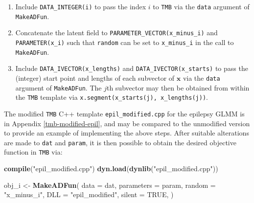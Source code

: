 \documentclass[a4paper, nobind]{templates/ociamthesis}
\providecommand{\tightlist}{%
  \setlength{\itemsep}{0pt}\setlength{\parskip}{0pt}}
\newenvironment{Shaded}{\begin{snugshade}}{\end{snugshade}}
\newcommand{\AttributeTok}[1]{\textcolor[rgb]{0.13,0.29,0.53}{#1}}
\newcommand{\ConstantTok}[1]{\textcolor[rgb]{0.56,0.35,0.01}{#1}}
\newcommand{\FunctionTok}[1]{\textcolor[rgb]{0.13,0.29,0.53}{\textbf{#1}}}
\newcommand{\NormalTok}[1]{#1}
\newcommand{\OtherTok}[1]{\textcolor[rgb]{0.56,0.35,0.01}{#1}}
\newcommand{\StringTok}[1]{\textcolor[rgb]{0.31,0.60,0.02}{#1}}
\renewenvironment{Shaded}
{
  \vspace{10pt}%
  \begin{snugshade}%
}{%
  \end{snugshade}%
  \vspace{8pt}%
}
\begin{document}
\begin{enumerate}
\def\labelenumi{\arabic{enumi}.}
\tightlist
\item
  Include \texttt{DATA\_INTEGER(i)} to pass the index \(i\) to \texttt{TMB} via the \texttt{data} argument of \texttt{MakeADFun}.
\item
  Concatenate the latent field to \texttt{PARAMETER\_VECTOR(x\_minus\_i)} and \texttt{PARAMETER(x\_i)} such that \texttt{random} can be set to \texttt{x\_minus\_i} in the call to \texttt{MakeADFun}.
\item
  Include \texttt{DATA\_IVECTOR(x\_lengths)} and \texttt{DATA\_IVECTOR(x\_starts)} to pass the (integer) start point and lengths of each subvector of \(\mathbf{x}\) via the \texttt{data} argument of \texttt{MakeADFun}.
  The \(j\)th subvector may then be obtained from within the \texttt{TMB} template via \texttt{x.segment(x\_starts(j),\ x\_lengths(j))}.
\end{enumerate}

The modified \texttt{TMB} C++ template \texttt{epil\_modified.cpp} for the epilepsy GLMM is in Appendix \ref{tmb-modified-epil}, and may be compared to the unmodified version to provide an example of implementing the above steps.
After suitable alterations are made to \texttt{dat} and \texttt{param}, it is then possible to obtain the desired objective function in \texttt{TMB} via:

\begin{Shaded}
\begin{Highlighting}[]
\FunctionTok{compile}\NormalTok{(}\StringTok{"epil\_modified.cpp"}\NormalTok{)}
\FunctionTok{dyn.load}\NormalTok{(}\FunctionTok{dynlib}\NormalTok{(}\StringTok{"epil\_modified.cpp"}\NormalTok{))}

\NormalTok{obj\_i }\OtherTok{\textless{}{-}} \FunctionTok{MakeADFun}\NormalTok{(}
  \AttributeTok{data =}\NormalTok{ dat,}
  \AttributeTok{parameters =}\NormalTok{ param,}
  \AttributeTok{random =} \StringTok{"x\_minus\_i"}\NormalTok{,}
  \AttributeTok{DLL =} \StringTok{"epil\_modified"}\NormalTok{,}
  \AttributeTok{silent =} \ConstantTok{TRUE}\NormalTok{,}
\NormalTok{)}
\end{Highlighting}
\end{Shaded}
\end{document}
